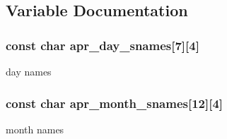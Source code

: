 \subsection{Variable Documentation}
\hypertarget{group__apr__time_ga37d6f7740ae0f5d8ae9cfc286e8712be}{
\subsubsection[{apr\-\_\-day\-\_\-snames}]{\setlength{\rightskip}{0pt plus 5cm}const char apr\-\_\-day\-\_\-snames\mbox{[}7\mbox{]}\mbox{[}4\mbox{]}}}\label{group__apr__time_ga37d6f7740ae0f5d8ae9cfc286e8712be}
day names \hypertarget{group__apr__time_ga77382d017a2bef80d44478e0b41557a4}{
\subsubsection[{apr\-\_\-month\-\_\-snames}]{\setlength{\rightskip}{0pt plus 5cm}const char apr\-\_\-month\-\_\-snames\mbox{[}12\mbox{]}\mbox{[}4\mbox{]}}}\label{group__apr__time_ga77382d017a2bef80d44478e0b41557a4}
month names 